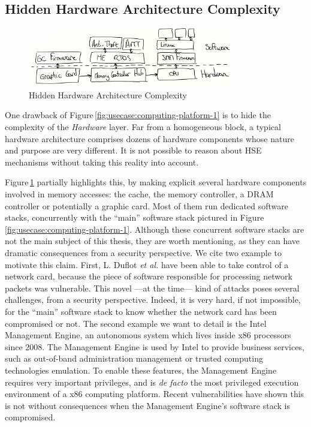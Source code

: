 \subsection{Hidden Hardware Architecture Complexity}

\begin{figure}
  \centering
  \includegraphics[width=0.8\textwidth]{Figures/intro-computing-platform.jpg}
  \caption{Hidden Hardware Architecture Complexity}
  \label{fig:usecase:computing-platform-2}
\end{figure}

One drawback of Figure\,\ref{fig:usecase:computing-platform-1} is to hide the
complexity of the \emph{Hardware} layer.
%
Far from a homogeneous block, a typical hardware architecture comprises dozens
of hardware components whose nature and purpose are very different.
%
It is not possible to reason about HSE mechanisms without taking this reality
into account.

Figure\,\ref{fig:usecase:computing-platform-2} partially highlights this, by
making explicit several hardware components involved in memory accesses: the
cache, the memory controller, a DRAM controller or potentially a graphic card.
%
Most of them run dedicated software stacks, concurrently with the ``main''
software stack pictured in Figure\,\ref{fig:usecase:computing-platform-1}.
%
Although these concurrent software stacks are not the main subject of this
thesis, they are worth mentioning, as they can have dramatic consequences from a
security perspective.
%
We cite two example to motivate this claim.
%
First, L. Duflot \emph{et al.} have been able to take control of a network card,
because the piece of software responsible for processing network packets was
vulnerable.
%
This novel ---at the time--- kind of attacks poses several challenges, from a
security perspective.
%
Indeed, it is very hard, if not impossible, for the ``main'' software stack to
know whether the network card has been compromised or not.
%
The second example we want to detail is the Intel Management Engine, an
autonomous system which lives inside x86 processors since 2008.
%
The Management Engine is used by Intel to provide business services, such as
out-of-band administration management or trusted computing technologies
emulation.
%
To enable these features, the Management Engine requires very important
privileges, and is \emph{de facto} the most privileged execution environment of
a x86 computing platform.
%
Recent vulnerabilities have shown this is not without consequences when the
Management Engine's software stack is compromised.

